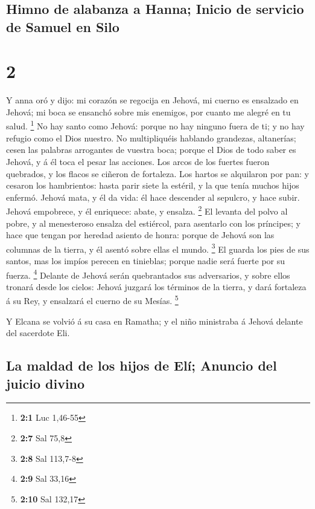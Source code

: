 \hypertarget{himno-de-alabanza-a-hanna-inicio-de-servicio-de-samuel-en-silo}{%
\subsection{Himno de alabanza a Hanna; Inicio de servicio de Samuel en
Silo}\label{himno-de-alabanza-a-hanna-inicio-de-servicio-de-samuel-en-silo}}

\hypertarget{section-1}{%
\section{2}\label{section-1}}

 Y anna oró y dijo: mi corazón se regocija en Jehová, mi
cuerno es ensalzado en Jehová; mi boca se ensanchó sobre mis enemigos,
por cuanto me alegré en tu salud. \footnote{\textbf{2:1} Luc 1,46-55}
 No hay santo como Jehová: porque no hay ninguno fuera de
ti; y no hay refugio como el Dios nuestro.  No multipliquéis
hablando grandezas, altanerías; cesen las palabras arrogantes de vuestra
boca; porque el Dios de todo saber es Jehová, y á él toca el pesar las
acciones.  Los arcos de los fuertes fueron quebrados, y los
flacos se ciñeron de fortaleza.  Los hartos se alquilaron
por pan: y cesaron los hambrientos: hasta parir siete la estéril, y la
que tenía muchos hijos enfermó.  Jehová mata, y él da vida:
él hace descender al sepulcro, y hace subir.  Jehová
empobrece, y él enriquece: abate, y ensalza. \footnote{\textbf{2:7} Sal
  75,8}  El levanta del polvo al pobre, y al menesteroso
ensalza del estiércol, para asentarlo con los príncipes; y hace que
tengan por heredad asiento de honra: porque de Jehová son las columnas
de la tierra, y él asentó sobre ellas el mundo. \footnote{\textbf{2:8}
  Sal 113,7-8}  El guarda los pies de sus santos, mas los
impíos perecen en tinieblas; porque nadie será fuerte por su fuerza.
\footnote{\textbf{2:9} Sal 33,16}  Delante de Jehová serán
quebrantados sus adversarios, y sobre ellos tronará desde los cielos:
Jehová juzgará los términos de la tierra, y dará fortaleza á su Rey, y
ensalzará el cuerno de su Mesías. \footnote{\textbf{2:10} Sal 132,17}

 Y Elcana se volvió á su casa en Ramatha; y el niño
ministraba á Jehová delante del sacerdote Eli.

\hypertarget{la-maldad-de-los-hijos-de-eluxed-anuncio-del-juicio-divino}{%
\subsection{La maldad de los hijos de Elí; Anuncio del juicio
divino}\label{la-maldad-de-los-hijos-de-eluxed-anuncio-del-juicio-divino}}

